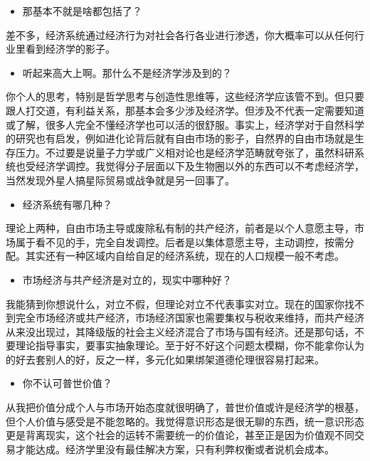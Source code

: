 \documentclass[
  letterpaper,
  DIV=11,
  numbers=noendperiod]{scrreprt}
\providecommand{\tightlist}{%
  \setlength{\itemsep}{0pt}\setlength{\parskip}{0pt}}\usepackage{longtable,booktabs,array}
\begin{document}
\begin{itemize}
\tightlist
\item
  那基本不就是啥都包括了？
\end{itemize}

差不多，经济系统通过经济行为对社会各行各业进行渗透，你大概率可以从任何行业里看到经济学的影子。

\begin{itemize}
\tightlist
\item
  听起来高大上啊。那什么不是经济学涉及到的？
\end{itemize}

你个人的思考，特别是哲学思考与创造性思维等，这些经济学应该管不到。但只要跟人打交道，有利益关系，那基本会多少涉及经济学。但涉及不代表一定需要知道或了解，很多人完全不懂经济学也可以活的很舒服。事实上，经济学对于自然科学的研究也有启发，例如进化论背后就有自由市场的影子，自然界的自由市场就是生存压力。不过要是说量子力学或广义相对论也是经济学范畴就夸张了，虽然科研系统也受经济学调控。我觉得分子层面以下及生物圈以外的东西可以不考虑经济学，当然发现外星人搞星际贸易或战争就是另一回事了。

\begin{itemize}
\tightlist
\item
  经济系统有哪几种？
\end{itemize}

理论上两种，自由市场主导或废除私有制的共产经济，前者是以个人意愿主导，市场属于看不见的手，完全自发调控。后者是以集体意愿主导，主动调控，按需分配。其实还有一种区域内自给自足的经济系统，现在的人口规模一般不考虑。

\begin{itemize}
\tightlist
\item
  市场经济与共产经济是对立的，现实中哪种好？
\end{itemize}

我能猜到你想说什么，对立不假，但理论对立不代表事实对立。现在的国家你找不到完全市场经济或共产经济，市场经济国家也需要集权与税收来维持，而共产经济从来没出现过，其降级版的社会主义经济混合了市场与国有经济。还是那句话，不要理论指导事实，要事实抽象理论。至于好不好这个问题太模糊，你不能拿你认为的好去套别人的好，反之一样，多元化如果绑架道德伦理很容易打起来。

\begin{itemize}
\tightlist
\item
  你不认可普世价值？
\end{itemize}

从我把价值分成个人与市场开始态度就很明确了，普世价值或许是经济学的根基，但个人价值与感受是不能忽略的。我觉得意识形态是很无聊的东西，统一意识形态更是背离现实，这个社会的运转不需要统一的价值论，甚至正是因为价值观不同交易才能达成。经济学里没有最佳解决方案，只有利弊权衡或者说机会成本。
\end{document}
